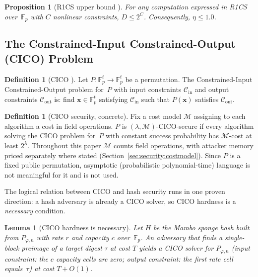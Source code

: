 \documentclass[11pt,a4paper]{article}
\newtheorem{lemma}[theorem]{Lemma}
\newtheorem{proposition}[theorem]{Proposition}
\theoremstyle{definition}
\newtheorem{definition}[theorem]{Definition}
\newcommand{\Fp}{\mathbb{F}_p}
\begin{document}
\begin{proposition}[R1CS upper bound {\cite[Prop.~3.2]{ALFOMs}}]\label{prop:upper}
For any computation expressed in R1CS over~$\Fp$ with $C$ nonlinear
constraints, $D \le 2^C$. Consequently, $\eta \le 1.0$.
\end{proposition}


\subsection{The Constrained-Input Constrained-Output (CICO) Problem}\label{sec:prelim:cico}

\begin{definition}[CICO {\cite{Anemoi}}]\label{def:cico}
Let $P\colon \Fp^t \to \Fp^t$ be a permutation. The
Constrained-Input Constrained-Output problem for~$P$ with input constraints
$\mathcal{C}_{\mathrm{in}}$ and output constraints
$\mathcal{C}_{\mathrm{out}}$ is: find $\mathbf{x} \in \Fp^t$ satisfying
$\mathcal{C}_{\mathrm{in}}$ such that $P(\mathbf{x})$ satisfies
$\mathcal{C}_{\mathrm{out}}$.
\end{definition}

\begin{definition}[CICO security, concrete]\label{def:cico_sec}
Fix a cost model $\mathcal{M}$ assigning to each algorithm a cost in
field operations. $P$ is $(\lambda, \mathcal{M})$-CICO-secure if every
algorithm solving the CICO problem for~$P$ with constant success
probability has $\mathcal{M}$-cost at least $2^{\lambda}$. Throughout
this paper $\mathcal{M}$ counts field operations, with attacker
memory priced separately where stated
(Section~\ref{sec:security:costmodel}). Since $P$ is a fixed public
permutation, asymptotic (probabilistic polynomial-time) language is
not meaningful for it and is not used.
\end{definition}

The logical relation between CICO and hash security runs in one
proven direction: a hash adversary is already a CICO solver, so CICO
hardness is a \emph{necessary} condition.

\begin{lemma}[CICO hardness is necessary]\label{lem:cico_necessary}
Let $H$ be the Mambo sponge hash built from $P_{\varphi,n}$ with rate
$r$ and capacity $c$ over~$\Fp$. An adversary that finds a
single-block preimage of a target digest $\tau$ at cost $T$ yields a
CICO solver for $P_{\varphi,n}$ (input constraint: the $c$ capacity
cells are zero; output constraint: the first rate cell
equals~$\tau$) at cost $T + O(1)$.
\end{lemma}
\end{document}
